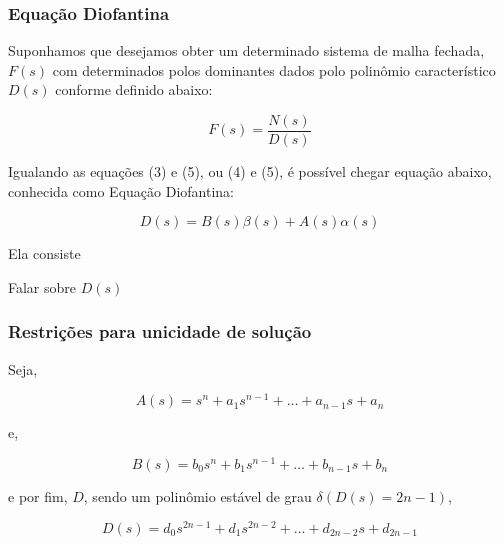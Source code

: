 \documentclass[conference,harvard,brazil,english]{sbatex}
\begin{document}
            
        \subsubsection{Equação Diofantina}
        
            Suponhamos que desejamos obter um determinado sistema de malha fechada, $F(s)$ com determinados polos dominantes dados polo polinômio característico $D(s)$ conforme definido abaixo:
            
            \begin{equation}
                \label{equ:ND}
                F(s) = \frac{N(s)}{D(s)}
            \end{equation}
                
           Igualando as equações (3) e (5), ou (4) e (5), é possível chegar equação abaixo, conhecida como Equação Diofantina:
            
            \begin{equation}
                \label{equ:diofantina}
                D(s) =  B(s) \beta(s) + A(s) \alpha(s) 
            \end{equation}
            
            Ela consiste
            
            Falar sobre $D(s)$
            
        \subsubsection{Restrições para unicidade de solução}
        
            Seja,
            
            \begin{equation}
                \label{equ:As}
                A(s) = s^n + a_1s^{n-1} + \dots + a_{n-1}s + a_n
            \end{equation}
            
            e,
            
            \begin{equation}
                \label{equ:Bs}
                B(s) = b_0s^n + b_1s^{n-1} + \dots + b_{n-1}s + b_n
            \end{equation}
        
            e por fim, $D$, sendo um polinômio estável de grau $\delta(D(s) = 2n-1)$, 
            
            \begin{equation}
                \label{equ:Ds}
                D(s) = d_0s^{2n-1} + d_1s^{2n-2} + \dots + d_{2n-2}s + d_{2n-1}
            \end{equation}
            
\end{document}
